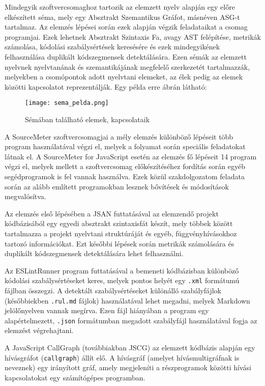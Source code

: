 Mindegyik szoftvercsomaghoz tartozik az elemzett nyelv alapján egy előre elkészített séma, mely egy Absztrakt Szemantikus Gráfot, másnéven ASG-t tartalmaz. Az elemzés lépései során ezek alapján végzik feladataikat a csomag programjai. Ezek lehetnek Absztrakt Szintaxis Fa, avagy AST felépítése, metrikák számolása, kódolási szabálysértések keresésére és ezek mindegyikének felhasználása duplikált kódszegmensek detektálására.
Ezen sémák az elemzett nyelvnek nyelvtanának és szemantikájának megfelelő szerkezetét tartalmazzák, melyekben a csomópontok adott nyelvtani elemeket, az élek pedig az elemek közötti kapcsolatot reprezentálják. Egy példa erre  ábrán látható:

\begin{figure}[!htbp]
    \caption{Sémában található elemek, kapcsolataik}\label{fig:sema_pelda}
    \centering
    \texttt{[image: sema\_pelda.png]}
\end{figure}

A SourceMeter szoftvercsomagjai a mély elemzés különböző lépéseit több program használatával végzi el, melyek a folyamat során speciális feladatokat látnak el. A SourceMeter for JavaScript esetén az elemzés fő lépéseit 14 program végzi el, melyek mellett a szoftvercsomag előkészítéséhez fordítás során egyéb segédprogramok is fel vannak használva. Ezek közül szakdolgozatom feladata során az alább említett programokban lesznek bővítések és módosítások megvalósítva.

Az elemzés első lépésében a JSAN futtatásával az elemzendő projekt kódbázisából egy egyedi absztrakt szintaxisfát készít, mely többek között tartalmazza a projekt nyelvtani struktúráját és egyéb, függvényhívásokhoz tartozó információkat. Ezt későbbi lépések során metrikák számolására és duplikált kódszegmensek detektálására lehet felhasználni.

Az ESLintRunner program futtatásával a bemeneti kódbázisban különböző kódolási szabálysértéseket keres, melyek pontos helyét egy \texttt{.xml} formátumú fájlban összegzi. A detektált szabálysértéseket különálló szabályfájlok (későbbiekben \texttt{.rul.md} fájlok) használatával lehet megadni, melyek Markdown jelölőnyelven vannak megírva. Ezen fájl hiányában a program egy alapértelmezett, \texttt{.json} formátumban megadott szabályfájl használatával fogja az elemzést végrehajtani.

A JavaScript CallGraph (továbbiakban JSCG) az elemzett kódbázis alapján egy hívásgráfot (\texttt{callgraph}) állít elő. A hívásgráf (amelyet hívásmultigráfnak is neveznek) egy irányított gráf, amely megjeleníti a részprogramok közötti hívási kapcsolatokat egy számítógépes programban. 

